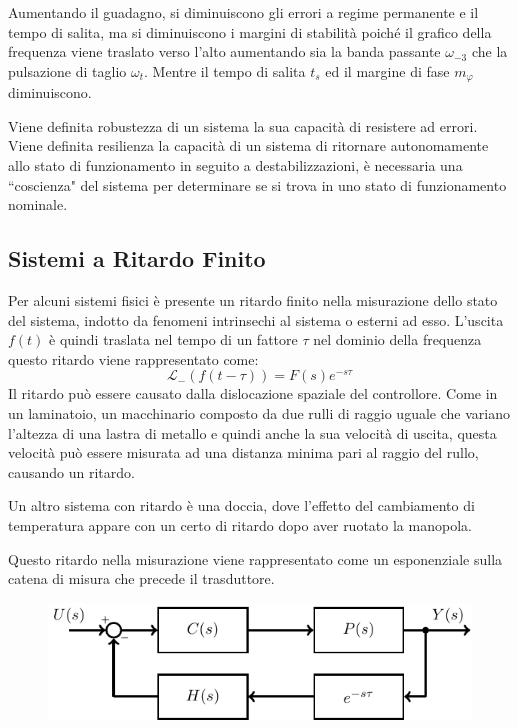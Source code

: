 \documentclass{article}
\numberwithin{equation}{subsection}
\begin{document}
Aumentando il guadagno, si diminuiscono gli errori a regime permanente e il tempo di salita, ma si diminuiscono i margini di stabilità poiché il grafico della frequenza 
viene traslato verso l'alto aumentando sia la banda passante $\omega_{-3}$ che la pulsazione di taglio $\omega_t$. Mentre il tempo di salita $t_s$ ed il margine di fase 
$m_{\varphi}$ diminuiscono. 



Viene definita robustezza di un sistema la sua capacità di resistere ad errori. Viene definita resilienza la capacità di un sistema di ritornare 
autonomamente allo stato di funzionamento in seguito a destabilizzazioni, è necessaria una ``coscienza" del sistema per determinare se si trova in uno stato di 
funzionamento nominale. 

\subsection{Sistemi a Ritardo Finito}

Per alcuni sistemi fisici è presente un ritardo finito nella misurazione dello stato del sistema, indotto da fenomeni intrinsechi al sistema o esterni ad esso. 
L'uscita $f(t)$ è quindi traslata nel tempo di un fattore $\tau$ nel dominio della frequenza questo ritardo viene rappresentato come: 
\begin{equation*}
    \mathcal{L}_-(f(t-\tau))=F(s)e^{-s\tau}
\end{equation*}
Il ritardo può essere causato dalla dislocazione spaziale del controllore. Come in un laminatoio, un macchinario composto da due rulli di raggio uguale 
che variano l'altezza di una lastra di metallo e quindi anche la sua velocità di uscita, questa velocità può essere misurata ad una distanza minima 
pari al raggio del rullo, causando un ritardo. 

Un altro sistema con ritardo è una doccia, dove l'effetto del cambiamento di temperatura appare con un certo di ritardo dopo aver ruotato la manopola. 

Questo ritardo nella misurazione viene rappresentato come un esponenziale sulla catena di misura che precede il trasduttore. 

\begin{figure}[H]%
    \centering
    \includegraphics{ritardo-finito.pdf}%
\end{figure}
\end{document}
